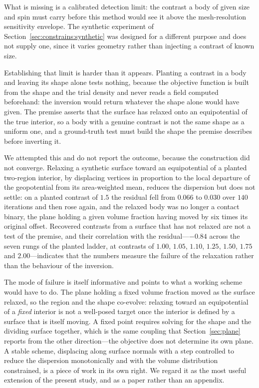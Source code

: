 What is missing is a calibrated detection limit: the contrast a body of
given size and spin must carry before this method would see it above the
mesh-resolution sensitivity envelope. The synthetic experiment of
Section~\ref{sec:constrains:synthetic} was designed for a different purpose
and does not supply one, since it varies geometry rather than injecting a
contrast of known size.

Establishing that limit is harder than it appears. Planting a contrast in a
body and leaving its shape alone tests nothing, because the objective
function is built from the shape and the trial density and never reads a
field computed beforehand: the inversion would return whatever the shape
alone would have given. The premise asserts that the surface has relaxed
onto an equipotential of the true interior, so a body with a genuine
contrast is not the same shape as a uniform one, and a ground-truth test
must build the shape the premise describes before inverting it.

We attempted this and do not report the outcome, because the construction did
not converge. Relaxing a synthetic surface toward an equipotential of a
planted two-region interior, by displacing vertices in proportion to the
local departure of the geopotential from its area-weighted mean, reduces the
dispersion but does not settle: on a planted contrast of $1.5$ the residual
fell from $0.066$ to $0.030$ over $140$ iterations and then rose again, and
the relaxed body was no longer a contact binary, the plane holding a given
volume fraction having moved by six times its original offset. Recovered
contrasts from a surface that has not relaxed are not a test of the premise,
and their correlation with the residual---$-0.84$ across the seven rungs of the
planted ladder, at contrasts of $1.00$, $1.05$, $1.10$, $1.25$, $1.50$,
$1.75$ and $2.00$---indicates that the numbers measure the failure of the
relaxation rather than the behaviour of the inversion.

The mode of failure is itself informative and points to what a working
scheme would have to do. The plane holding a fixed volume fraction moved as
the surface relaxed, so the region and the shape co-evolve: relaxing toward
an equipotential of a \emph{fixed} interior is not a well-posed target once
the interior is defined by a surface that is itself moving. A fixed point
requires solving for the shape and the dividing surface together, which is
the same coupling that Section~\ref{sec:plane} reports from the other
direction---the objective does not determine its own plane. A stable scheme,
displacing along surface normals with a step controlled to reduce the
dispersion monotonically and with the volume distribution constrained, is a
piece of work in its own right. We regard it as the most useful extension of
the present study, and as a paper rather than an appendix.

